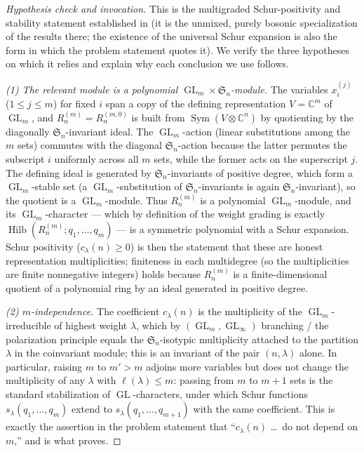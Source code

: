 \documentclass[11pt]{amsart}
\theoremstyle{definition}
\newcommand{\C}{\mathbb{C}}
\DeclareMathOperator{\Hilb}{Hilb}
\DeclareMathOperator{\GL}{GL}
\DeclareMathOperator{\Sym}{Sym}
\begin{document}
\begin{proof}[Hypothesis check and invocation]
This is the multigraded Schur-positivity and stability statement established in
\cite{Bergeron2020} (it is the unmixed, purely bosonic specialization of the
results there; the existence of the universal Schur expansion is also the form in
which the problem statement quotes it). We verify the three hypotheses on which it
relies and explain why each conclusion we use follows.

\smallskip\noindent\emph{(1) The relevant module is a polynomial
$\GL_m\times\mathfrak{S}_n$-module.} The variables $x_i^{(j)}$ ($1\le j\le m$) for
fixed $i$ span a copy of the defining representation $V=\C^m$ of $\GL_m$, and
$R_n^{(m)}=R_n^{(m,0)}$ is built from $\Sym(V\otimes\C^n)$ by quotienting by the
diagonally $\mathfrak{S}_n$-invariant ideal. The $\GL_m$-action (linear
substitutions among the $m$ sets) commutes with the diagonal $\mathfrak{S}_n$-action
because the latter permutes the subscript $i$ uniformly across all $m$ sets, while
the former acts on the superscript $j$. The defining ideal is generated by
$\mathfrak{S}_n$-invariants of positive degree, which form a $\GL_m$-stable set
(a $\GL_m$-substitution of $\mathfrak{S}_n$-invariants is again
$\mathfrak{S}_n$-invariant), so the quotient is a $\GL_m$-module. Thus $R_n^{(m)}$
is a polynomial $\GL_m$-module, and its $\GL_m$-character --- which by definition
of the weight grading is exactly $\Hilb(R_n^{(m)};q_1,\dots,q_m)$ --- is a
symmetric polynomial with a Schur expansion. Schur positivity
($c_\lambda(n)\ge0$) is then the statement that these are honest representation
multiplicities; finiteness in each multidegree (so the multiplicities are finite
nonnegative integers) holds because $R_n^{(m)}$ is a finite-dimensional quotient
of a polynomial ring by an ideal generated in positive degree.

\smallskip\noindent\emph{(2) $m$-independence.} The coefficient $c_\lambda(n)$ is
the multiplicity of the $\GL_m$-irreducible of highest weight $\lambda$, which by
$(\GL_m,\GL_\infty)$ branching / the polarization principle equals the
$\mathfrak{S}_n$-isotypic multiplicity attached to the partition $\lambda$ in the
coinvariant module; this is an invariant of the pair $(n,\lambda)$ alone. In
particular, raising $m$ to $m'>m$ adjoins more variables but does not change the
multiplicity of any $\lambda$ with $\ell(\lambda)\le m$: passing from $m$ to $m+1$
sets is the standard stabilization of $\GL$-characters, under which Schur functions
$s_\lambda(q_1,\dots,q_m)$ extend to $s_\lambda(q_1,\dots,q_{m+1})$ with the same
coefficient. This is exactly the assertion in the problem statement that
``$c_\lambda(n)$ \dots\ do not depend on $m$,'' and is what \cite{Bergeron2020}
proves.


\end{proof}
\end{document}
